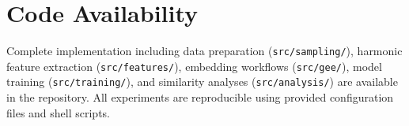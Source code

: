 \documentclass[utf8]{FrontiersinHarvard}
\begin{document}
\section*{Code Availability}
Complete implementation including data preparation (\texttt{src/sampling/}), harmonic feature extraction (\texttt{src/features/}), embedding workflows (\texttt{src/gee/}), model training (\texttt{src/training/}), and similarity analyses (\texttt{src/analysis/}) are available in the repository. All experiments are reproducible using provided configuration files and shell scripts.



\end{document}
